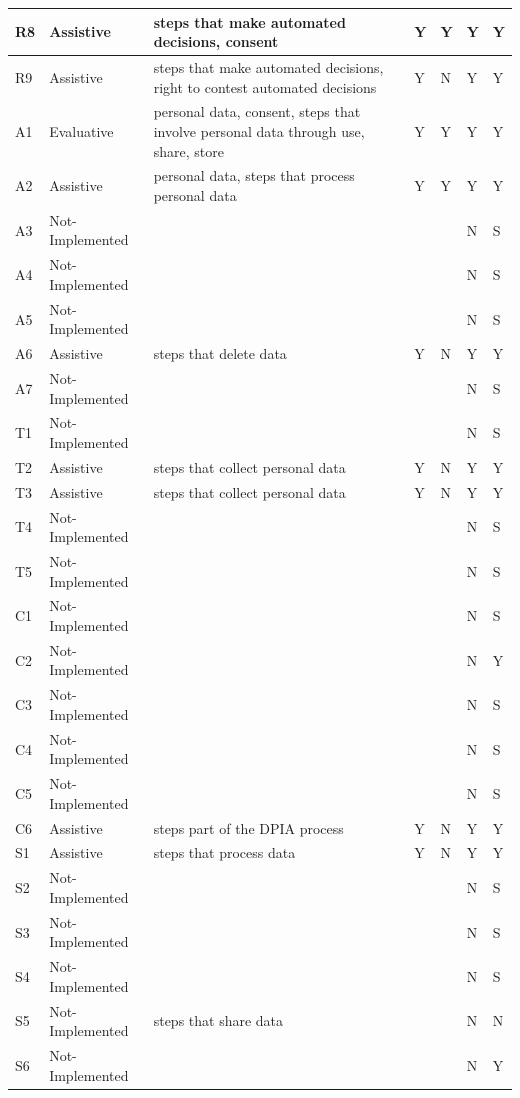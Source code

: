 \begin{center}
\begin{tabularx}{\textwidth}{|l|l|X|l|l|l|l|}
R8 & Assistive & steps that make automated decisions, consent & Y & Y & Y & Y \\ \hline
R9 & Assistive & steps that make automated decisions, right to contest automated decisions & Y & N & Y & Y \\ \hline
A1 & Evaluative & personal data, consent, steps that involve personal data through use, share, store & Y & Y & Y & Y \\ \hline
A2 & Assistive & personal data, steps that process personal data & Y & Y & Y & Y \\ \hline
A3 & Not-Implemented &  &  &  & N & S \\ \hline
A4 & Not-Implemented &  &  &  & N & S \\ \hline
A5 & Not-Implemented &  &  &  & N & S \\ \hline
A6 & Assistive & steps that delete data & Y & N & Y & Y \\ \hline
A7 & Not-Implemented &  &  &  & N & S \\ \hline
T1 & Not-Implemented &  &  &  & N & S \\ \hline
T2 & Assistive & steps that collect personal data & Y & N & Y & Y \\ \hline
T3 & Assistive & steps that collect personal data & Y & N & Y & Y \\ \hline
T4 & Not-Implemented &  &  &  & N & S \\ \hline
T5 & Not-Implemented &  &  &  & N & S \\ \hline
C1 & Not-Implemented &  &  &  & N & S \\ \hline
C2 & Not-Implemented &  &  &  & N & Y \\ \hline
C3 & Not-Implemented &  &  &  & N & S \\ \hline
C4 & Not-Implemented &  &  &  & N & S \\ \hline
C5 & Not-Implemented &  &  &  & N & S \\ \hline
C6 & Assistive & steps part of the DPIA process & Y & N & Y & Y \\ \hline
S1 & Assistive & steps that process data & Y & N & Y & Y \\ \hline
S2 & Not-Implemented &  &  &  & N & S \\ \hline
S3 & Not-Implemented &  &  &  & N & S \\ \hline
S4 & Not-Implemented &  &  &  & N & S \\ \hline
S5 & Not-Implemented & steps that share data &  &  & N & N \\ \hline
S6 & Not-Implemented &  &  &  & N & Y \\ \hline

\end{tabularx}
\end{center}
